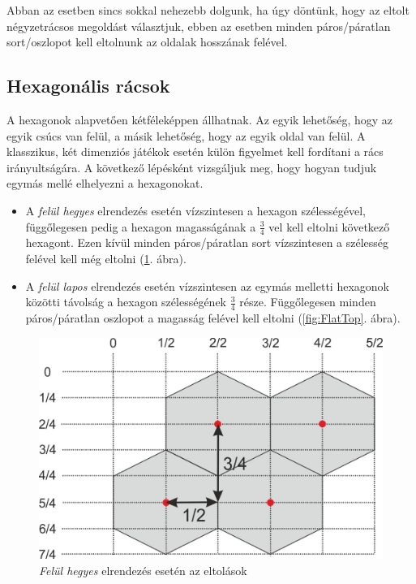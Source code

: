 Abban az esetben sincs sokkal nehezebb dolgunk, ha úgy döntünk, hogy az eltolt négyzetrácsos megoldást választjuk, ebben az esetben minden páros/páratlan sort/oszlopot kell eltolnunk az oldalak hosszának felével.

\subsection{Hexagonális rácsok}

A hexagonok alapvetően kétféleképpen állhatnak. Az egyik lehetőség, hogy az egyik csúcs van felül, a másik lehetőség, hogy az egyik oldal van felül. A klasszikus, két dimenziós játékok esetén külön figyelmet kell fordítani a rács irányultságára. A következő lépésként vizsgáljuk meg, hogy hogyan tudjuk egymás mellé elhelyezni a hexagonokat.
\begin{itemize}
    \item A \textit{felül hegyes} elrendezés esetén vízszintesen a hexagon szélességével, függőlegesen pedig a hexagon magasságának a $\frac{3}{4}$ vel kell eltolni következő hexagont. Ezen kívül minden páros/páratlan sort vízszintesen a szélesség felével kell még eltolni (\ref{fig:PointyTop}. ábra).
    \item A \textit{felül lapos} elrendezés esetén vízszintesen az egymás melletti hexagonok közötti távolság a hexagon szélességének $\frac{3}{4}$ része. Függőlegesen minden páros/páratlan oszlopot a magasság felével kell eltolni (\ref{fig:FlatTop}. ábra).
\end{itemize}

\begin{figure}[h!]
\centering
\includegraphics[scale=1.0]{kepek/PointyTop.jpg}
\caption{\textit{Felül hegyes} elrendezés esetén az eltolások}
\label{fig:PointyTop}
\end{figure}

